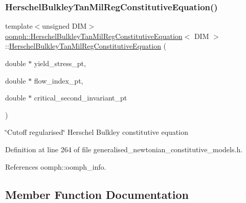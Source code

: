\subsubsection{\texorpdfstring{Herschel\+Bulkley\+Tan\+Mil\+Reg\+Constitutive\+Equation()}{HerschelBulkleyTanMilRegConstitutiveEquation()}}
{\footnotesize\ttfamily template$<$unsigned D\+IM$>$ \\
\hyperlink{classoomph_1_1HerschelBulkleyTanMilRegConstitutiveEquation}{oomph\+::\+Herschel\+Bulkley\+Tan\+Mil\+Reg\+Constitutive\+Equation}$<$ D\+IM $>$\+::\hyperlink{classoomph_1_1HerschelBulkleyTanMilRegConstitutiveEquation}{Herschel\+Bulkley\+Tan\+Mil\+Reg\+Constitutive\+Equation} (\begin{DoxyParamCaption}\item[{double $\ast$}]{yield\+\_\+stress\+\_\+pt,  }\item[{double $\ast$}]{flow\+\_\+index\+\_\+pt,  }\item[{double $\ast$}]{critical\+\_\+second\+\_\+invariant\+\_\+pt }\end{DoxyParamCaption})\hspace{0.3cm}{\ttfamily [inline]}}



\char`\"{}\+Cutoff regularised\char`\"{} Herschel Bulkley constitutive equation 



Definition at line 264 of file generalised\+\_\+newtonian\+\_\+constitutive\+\_\+models.\+h.



References oomph\+::oomph\+\_\+info.



\subsection{Member Function Documentation}
\mbox{\label{classoomph_1_1HerschelBulkleyTanMilRegConstitutiveEquation_a691613fc3cfa4bb2234dbc7eed260efc}} 
